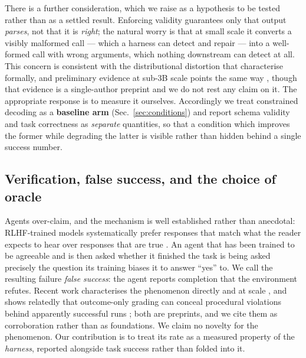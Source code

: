 \documentclass[11pt,a4paper]{article}
\begin{document}
There is a further consideration, which we raise as a hypothesis to be tested
rather than as a settled result. Enforcing validity guarantees only that output
\emph{parses}, not that it is \emph{right}; the natural worry is that at small
scale it converts a visibly malformed call --- which a harness can detect and
repair --- into a well-formed call with wrong arguments, which nothing downstream
can detect at all. This concern is consistent with the distributional distortion
that \citet{park2024grammar} characterise formally, and preliminary evidence at
sub-3B scale points the same way \citep{ray2026constrainttax}, though that
evidence is a single-author preprint and we do not rest any claim on it. The
appropriate response is to measure it ourselves. Accordingly we treat constrained
decoding as a \textbf{baseline arm} (Sec.~\ref{sec:conditions}) and report schema
validity and task correctness as \emph{separate} quantities, so that a condition
which improves the former while degrading the latter is visible rather than
hidden behind a single success number.

\subsection{Verification, false success, and the choice of oracle}

Agents over-claim, and the mechanism is well established rather than anecdotal:
RLHF-trained models systematically prefer responses that match what the reader
expects to hear over responses that are true \citep{sharma2024sycophancy}. An
agent that has been trained to be agreeable and is then asked whether it finished
the task is being asked precisely the question its training biases it to answer
``yes'' to. We call the resulting failure \emph{false success}: the agent reports
completion that the environment refutes. Recent work characterises the phenomenon
directly and at scale \citep{advani2026falsesuccess}, and shows relatedly that
outcome-only grading can conceal procedural violations behind apparently
successful runs \citep{cao2026corruptsuccess}; both are preprints, and we cite
them as corroboration rather than as foundations. We claim no novelty for the
phenomenon. Our contribution is to treat its rate as a measured property of the
\emph{harness}, reported alongside task success rather than folded into it.
\end{document}
